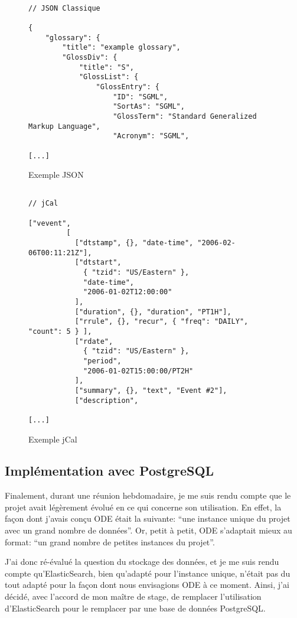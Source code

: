 \begin{figure}[H]
\begin{lstlisting}[frame=single]

// JSON Classique

{
    "glossary": {
        "title": "example glossary",
        "GlossDiv": {
            "title": "S",
            "GlossList": {
                "GlossEntry": {
                    "ID": "SGML",
                    "SortAs": "SGML",
                    "GlossTerm": "Standard Generalized Markup Language",
                    "Acronym": "SGML",

[...]

\end{lstlisting}
\caption{Exemple JSON}
\end{figure}
\begin{figure}[H]
\begin{lstlisting}[frame=single]

// jCal

["vevent",
         [
           ["dtstamp", {}, "date-time", "2006-02-06T00:11:21Z"],
           ["dtstart",
             { "tzid": "US/Eastern" },
             "date-time",
             "2006-01-02T12:00:00"
           ],
           ["duration", {}, "duration", "PT1H"],
           ["rrule", {}, "recur", { "freq": "DAILY", "count": 5 } ],
           ["rdate",
             { "tzid": "US/Eastern" },
             "period",
             "2006-01-02T15:00:00/PT2H"
           ],
           ["summary", {}, "text", "Event #2"],
           ["description",

[...]

\end{lstlisting}
\caption{Exemple jCal}
\end{figure}

\newpage

\subsection{Implémentation avec PostgreSQL}

Finalement, durant une réunion hebdomadaire, je me suis rendu compte que le projet avait légèrement évolué en ce qui concerne son utilisation. En effet, la façon dont j'avais conçu ODE était la suivante: ``une instance unique du projet avec un grand nombre de données''. Or, petit à petit, ODE s'adaptait mieux au format: ``un grand nombre de petites instances du projet''.

J'ai donc ré-évalué la question du stockage des données, et je me suis rendu compte qu'ElasticSearch, bien qu'adapté pour l'instance unique, n'était pas du tout adapté pour la façon dont nous envisagions ODE à ce moment. Ainsi, j'ai décidé, avec l'accord de mon maître de stage, de remplacer l'utilisation d'ElasticSearch pour le remplacer par une base de données PostgreSQL.

